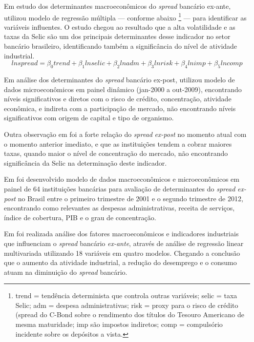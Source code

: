 \documentclass[12pt,12pt,openright,oneside,a4paper,chapter=TITLE,section=TITLE,subsection=TITLE,subsubsection=TITLE,english,french,spanish,portugues,sumario=tradicional]{abntex2}
\begin{document}
Em estudo dos determinantes macroeconômicos do \emph{spread} bancário ex-ante, \textcite{oreiro-2006} utilizou modelo de regressão múltipla --- conforme abaixo
\footnote{trend = tendência determinista que controla outras variáveis; selic = taxa Selic; adm = despesa administrativas; risk =  proxy para o risco de crédito (spread do C-Bond sobre o rendimento dos títulos do Tesouro Americano de mesma maturidade; imp são impostos indiretos; comp = compulsório incidente sobre os depósitos a vista.} --- para identificar as variáveis influentes. O estudo chegou ao resultado que a alta volatilidade e as taxas da Selic são um dos principais determinantes desse indicador no setor bancário brasileiro, identificando também a significância do nível de atividade industrial.
\[
ln spread = \beta_0 trend + \beta_1 ln selic + \beta_2 ln adm + \beta_3 ln risk + \beta_4 ln imp + \beta_5 ln comp
\]

Em análise dos determinantes do \emph{spread} bancário ex-post, \textcite{dantas:2012} utilizou modelo de dados microeconômicos em painel dinâmico (jan-2000 a out-2009), encontrando níveis significativos e diretos com o risco de crédito, concentração, atividade econômica, e indireta com a participação de mercado, não encontrando níveis significativos com origem de capital e tipo de organismo.

Outra observação em \textcite{dantas:2012} foi a forte relação do \emph{spread}
\emph{ex-post} no momento atual com o momento anterior imediato, e que as
instituições tendem a cobrar maiores taxas, quando maior o nível de
concentração do mercado, não encontrando significância da Selic na determinação
deste indicador.

Em \textcite{almeida:2013} foi desenvolvido modelo de dados macroeconômicos e microeconômicos em painel de 64 instituições bancárias para avaliação de determinantes do \emph{spread} \emph{ex-post} no Brasil entre o primeiro trimestre de 2001 e o segundo trimestre de 2012, encontrando como relevantes as despesas administrativas, receita de serviços, índice de cobertura, PIB e o grau de concentração.

Em \textcite{durigan:2018} foi realizada análise dos fatores macroeconômicos e
indicadores industriais que influenciam o \emph{spread} bancário \emph{ex-ante}, através de análise de regressão linear multivariada utilizando 18 variáveis em quatro
modelos. Chegando a conclusão que o aumento da atividade industrial, a redução
do desemprego e o consumo atuam na diminuição do \emph{spread} bancário.
\end{document}
